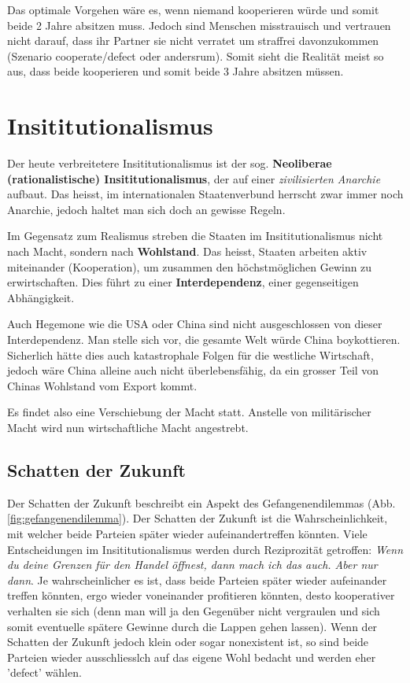 \documentclass[a4paper, 11pt]{article}
\begin{document}
Das optimale Vorgehen wäre es, wenn niemand kooperieren würde und somit beide 2 Jahre absitzen muss. Jedoch sind Menschen misstrauisch und vertrauen nicht darauf, dass ihr Partner sie nicht verratet um straffrei davonzukommen (Szenario cooperate/defect oder andersrum). Somit sieht die Realität meist so aus, dass beide kooperieren und somit beide 3 Jahre absitzen müssen.

\newpage

\section{Insititutionalismus}

Der heute verbreitetere Insititutionalismus ist der sog. \textbf{Neoliberae (rationalistische) Insititutionalismus}, der auf einer \textit{zivilisierten Anarchie} aufbaut. Das heisst, im internationalen Staatenverbund herrscht zwar immer noch Anarchie, jedoch haltet man sich doch an gewisse Regeln.

Im Gegensatz zum Realismus streben die Staaten im Insititutionalismus nicht nach Macht, sondern nach \textbf{Wohlstand}. Das heisst, Staaten arbeiten aktiv miteinander (Kooperation), um zusammen den höchstmöglichen Gewinn zu erwirtschaften. Dies führt zu einer \textbf{Interdependenz}, einer gegenseitigen Abhängigkeit. 

Auch Hegemone wie die USA oder China sind nicht ausgeschlossen von dieser Interdependenz. Man stelle sich vor, die gesamte Welt würde China boykottieren. Sicherlich hätte dies auch katastrophale Folgen für die westliche Wirtschaft, jedoch wäre China alleine auch nicht überlebensfähig, da ein grosser Teil von Chinas Wohlstand vom Export kommt.

Es findet also eine Verschiebung der Macht statt. Anstelle von militärischer Macht wird nun wirtschaftliche Macht angestrebt.

\subsection{Schatten der Zukunft} \label{sec:sdz} 
Der Schatten der Zukunft beschreibt ein Aspekt des Gefangenendilemmas (Abb. \ref{fig:gefangenendilemma}). Der Schatten der Zukunft ist die Wahrscheinlichkeit, mit welcher beide Parteien später wieder aufeinandertreffen könnten. Viele Entscheidungen im Insititutionalismus werden durch Reziprozität getroffen: \textit{Wenn du deine Grenzen für den Handel öffnest, dann mach ich das auch. Aber nur dann}. Je wahrscheinlicher es ist, dass beide Parteien später wieder aufeinander treffen könnten, ergo wieder voneinander profitieren könnten, desto kooperativer verhalten sie sich (denn man will ja den Gegenüber nicht vergraulen und sich somit eventuelle spätere Gewinne durch die Lappen gehen lassen). Wenn der Schatten der Zukunft jedoch klein oder sogar nonexistent ist, so sind beide Parteien wieder ausschliesslch auf das eigene Wohl bedacht und werden eher 'defect' wählen.
\end{document}
